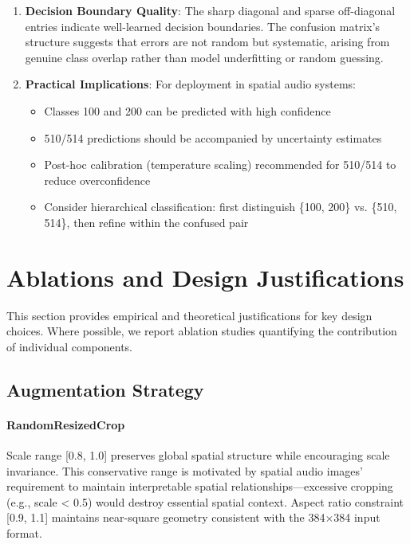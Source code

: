 \documentclass[11pt,a4paper]{article}
\begin{document}
\begin{enumerate}[leftmargin=*]
\item \textbf{Decision Boundary Quality}: The sharp diagonal and sparse off-diagonal entries indicate well-learned decision boundaries. The confusion matrix's structure suggests that errors are not random but systematic, arising from genuine class overlap rather than model underfitting or random guessing.

\item \textbf{Practical Implications}: For deployment in spatial audio systems:
\begin{itemize}
\item Classes 100 and 200 can be predicted with high confidence
\item 510/514 predictions should be accompanied by uncertainty estimates
\item Post-hoc calibration (temperature scaling) recommended for 510/514 to reduce overconfidence
\item Consider hierarchical classification: first distinguish \{100, 200\} vs. \{510, 514\}, then refine within the confused pair
\end{itemize}
\end{enumerate}

\section{Ablations and Design Justifications}
\label{sec:ablations}

This section provides empirical and theoretical justifications for key design choices. Where possible, we report ablation studies quantifying the contribution of individual components.

\subsection{Augmentation Strategy}

\paragraph{RandomResizedCrop} Scale range [0.8, 1.0] preserves global spatial structure while encouraging scale invariance. This conservative range is motivated by spatial audio images' requirement to maintain interpretable spatial relationships—excessive cropping (e.g., scale < 0.5) would destroy essential spatial context. Aspect ratio constraint [0.9, 1.1] maintains near-square geometry consistent with the 384\(\times\)384 input format.
\end{document}
